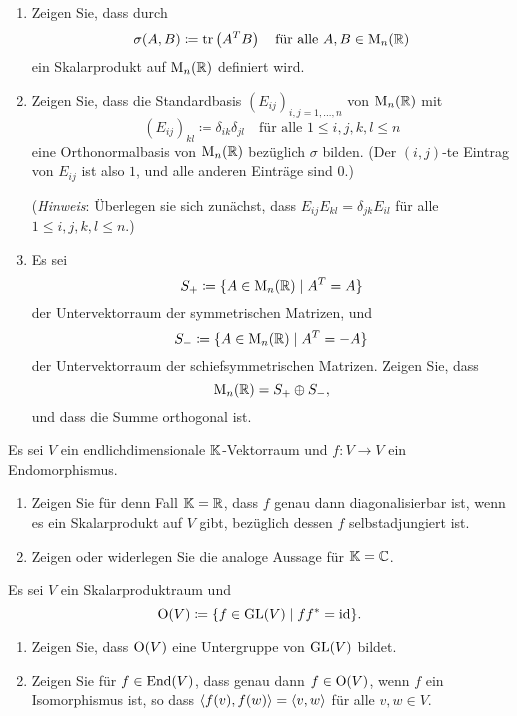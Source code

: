 \begin{question}[subtitle = Ein Skalarprodukt auf den reellen Matrizen]{2}
  \begin{enumerate}[leftmargin=*]
    \item
      Zeigen Sie, dass durch
      \[
        \sigma(A, B) \coloneqq \operatorname{tr}\left( A^T B \right)
        \quad
        \text{für alle $A, B \in \operatorname{M}_n(\mathbb{R})$}
      \]
      ein Skalarprodukt auf $\operatorname{M}_n(\mathbb{R})$ definiert wird.
    \item
      Zeigen Sie, dass die Standardbasis $(E_{ij})_{i,j=1,\dotsc,n}$ von $\operatorname{M}_n(\mathbb{R})$ mit
      \[
        (E_{ij})_{kl} \coloneqq \delta_{ik} \delta_{jl}
        \quad
        \text{für alle $1 \leq i,j,k,l \leq n$}
      \]
      eine Orthonormalbasis von $\operatorname{M}_n(\mathbb{R})$ bezüglich $\sigma$ bilden.
      (Der $(i,j)$-te Eintrag von $E_{ij}$ ist also $1$, und alle anderen Einträge sind $0$.)
      
      (\emph{Hinweis}:
       Überlegen sie sich zunächst, dass $E_{ij} E_{kl} = \delta_{jk} E_{il}$ für alle $1 \leq i,j,k,l \leq n$.)
    \item
      Es sei
      \[
        S_+ \coloneqq \{A \in \operatorname{M}_n(\mathbb{R}) \mid A^T = A\}
      \]
      der Untervektorraum der symmetrischen Matrizen, und
      \[
        S_- \coloneqq \{A \in \operatorname{M}_n(\mathbb{R}) \mid A^T  = -A\}
      \]
      der Untervektorraum der schiefsymmetrischen Matrizen.
      Zeigen Sie, dass
      \[
        \operatorname{M}_n(\mathbb{R}) = S_+ \oplus S_-,
      \]
      und dass die Summe orthogonal ist.
  \end{enumerate}
\end{question}


\begin{question}[subtitle = Diagonalisierbarkeit und Selbstadjungiertheit]{2}
  Es sei $V$ ein endlichdimensionale $\mathbb{K}$-Vektorraum und $f \colon V \to V$ ein Endomorphismus.
  \begin{enumerate}[leftmargin=*]
    \item
      Zeigen Sie für denn Fall $\mathbb{K} = \mathbb{R}$, dass $f$ genau dann diagonalisierbar ist, wenn es ein Skalarprodukt auf $V$ gibt, bezüglich dessen $f$ selbstadjungiert ist.
    \item
      Zeigen oder widerlegen Sie die analoge Aussage für $\mathbb{K} = \mathbb{C}$.
  \end{enumerate}
\end{question}


\begin{question}[subtitle = Die Isometriegruppe]{2}
  Es sei $V$ ein Skalarproduktraum und
  \[
    \operatorname{O}(V) \coloneqq \{ f \in \operatorname{GL}(V) \mid f f^* = \operatorname{id} \}.
  \]
  \begin{enumerate}[leftmargin=*]
    \item
      Zeigen Sie, dass $\operatorname{O}(V)$ eine Untergruppe von $\operatorname{GL}(V)$ bildet.
    \item
      Zeigen Sie für $f \in \operatorname{End}(V)$, dass genau dann $f \in \operatorname{O}(V)$, wenn $f$ ein Isomorphismus ist, so dass $\left\langle f(v), f(w) \right\rangle = \left\langle v,w \right\rangle$ für alle $v, w \in V$.
  \end{enumerate}
\end{question}


